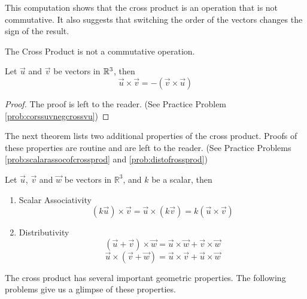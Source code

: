 \documentclass{ximera}
\begin{document}
\begin{exploration}
This computation shows that the cross product is an operation that is not commutative. It also suggests that switching the order of the vectors changes the sign of the result.
\end{exploration}

\begin{warning}The Cross Product is not a commutative operation.
\end{warning}

\begin{theorem}\label{th:corssuvnegcrossvu}
Let $\vec{u}$ and $\vec{v}$ be vectors in $\mathbb{R}^3$, then
$$\vec{u}\times\vec{v}=-(\vec{v}\times\vec{u})$$
\end{theorem}
\begin{proof}
The proof is left to the reader.  (See Practice Problem \ref{prob:corssuvnegcrossvu})
\end{proof}
The next theorem lists two additional properties of the cross product.  Proofs of these properties are routine and are left to the reader.  (See Practice Problems \ref{prob:scalarassocofcrossprod} and \ref{prob:distofrossprod})
\begin{theorem}\label{th:crossproductproperties}
Let $\vec{u}$, $\vec{v}$ and $\vec{w}$ be vectors in $\mathbb{R}^3$, and $k$ be a scalar, then\\
\begin{enumerate}
\item\label{item:scalarassocofcrossprod} Scalar Associativity
$$(k\vec{u})\times \vec{v}=\vec{u}\times (k\vec{v})=k(\vec{u}\times \vec{v})$$
\item\label{item:distofrossprod} Distributivity
$$(\vec{u}+\vec{v})\times \vec{w}=\vec{u}\times \vec{w}+\vec{v}\times \vec{w}$$
$$\vec{u}\times (\vec{v}+\vec{w})=\vec{u}\times \vec{v}+\vec{u}\times \vec{w}$$
\end{enumerate}
\end{theorem}

The cross product has several important geometric properties. The following problems give us a glimpse of these properties.
\end{document}
